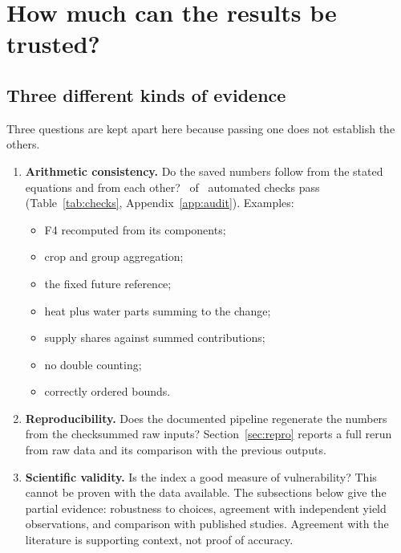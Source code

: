 \section{How much can the results be trusted?}\label{sec:checks}

\subsection{Three different kinds of evidence}
Three questions are kept apart here because passing one does not establish the others.
\begin{enumerate}
\item \textbf{Arithmetic consistency.} Do the saved numbers follow from the stated equations and from each other?
\checksPassed\ of \checksN\ automated checks pass (Table~\ref{tab:checks}, Appendix~\ref{app:audit}). Examples:
  \begin{itemize}
  \item F4 recomputed from its components;
  \item crop and group aggregation;
  \item the fixed future reference;
  \item heat plus water parts summing to the change;
  \item supply shares against summed contributions;
  \item no double counting;
  \item correctly ordered bounds.
  \end{itemize}
\item \textbf{Reproducibility.} Does the documented pipeline regenerate the numbers from the checksummed raw
inputs? Section~\ref{sec:repro} reports a full rerun from raw data and its comparison with the previous outputs.
\item \textbf{Scientific validity.} Is the index a good measure of vulnerability? This cannot be proven with the
data available. The subsections below give the partial evidence: robustness to choices, agreement with independent
yield observations, and comparison with published studies. Agreement with the literature is supporting context,
not proof of accuracy.
\end{enumerate}

